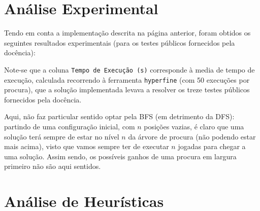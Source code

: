 \documentclass[12pt,a4paper]{article}
\begin{document}
\section*{Análise Experimental}

Tendo em conta a implementação descrita na página anterior, foram obtidos
os seguintes resultados experimentais (para os testes públicos fornecidos pela docência):

Note-se que a coluna \texttt{Tempo de Execução (s)} corresponde à media de tempo de execução,
calculada recorrendo à ferramenta \texttt{hyperfine} (com 50 execuções por procura),
que a solução implementada levava a resolver os treze testes públicos fornecidos
pela docência.

Aqui, não faz particular sentido optar pela BFS (em detrimento da DFS): partindo
de uma configuração inicial, com $n$ posições vazias, é claro que uma solução
terá sempre de estar no nível $n$ da árvore de procura (não podendo estar mais
acima), visto que vamos sempre ter de executar $n$ jogadas para chegar a uma
solução. Assim sendo, os possíveis ganhos de uma procura em largura primeiro não são
aqui sentidos.




\section*{Análise de Heurísticas}
\end{document}
